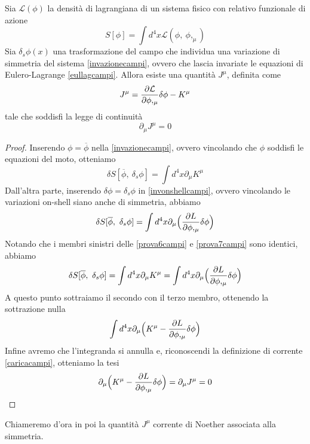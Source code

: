 \begin{theorem}
    Sia $\mathcal L(\phi)$ la densità di lagrangiana di un sistema fisico con relativo funzionale di azione
\begin{equation*}
    S[\phi] = \int d^4 x \mathcal L(\phi,~\phi,_\mu)
\end{equation*}
    Sia $\delta_s \phi(x)$ una trasformazione del campo che individua una variazione di simmetria del sistema \eqref{invazionecampi}, ovvero che lascia invariate le equazioni di Eulero-Lagrange \eqref{eullagcampi}. Allora esiste una quantità $J^\mu$, definita come
\begin{equation}\label{caricacampi}
    J^\mu = \frac{\partial\mathcal L}{\partial\phi,_\mu} \delta \phi - K^\mu 
\end{equation}
    tale che soddisfi la legge di continuità
\begin{equation} \label{thcampi}
    \partial_\mu J^\mu = 0
\end{equation}
\end{theorem}

\begin{proof}
    Inserendo $\phi = \overline \phi$ nella \eqref{invazionecampi}, ovvero vincolando che $\phi$ soddisfi le equazioni del moto, otteniamo 
\begin{equation}\label{prova6campi}
    \delta S[\overline \phi, ~\delta_s \phi] = \int d^4 x \partial_\mu K^\mu
\end{equation}
    Dall'altra parte, inserendo $\delta \phi = \delta_s \phi$ in \eqref{invonshellcampi}, ovvero vincolando le variazioni on-shell siano anche di simmetria, abbiamo
\begin{equation}\label{prova7campi}
    \delta S[\overline \phi,~\delta_s \phi] = \int d^4 x \partial_\mu \Big ( \frac{\partial L}{\partial\phi,_\mu}  \delta \phi \Big)
\end{equation}
    Notando che i membri sinistri delle \eqref{prova6campi} e \eqref{prova7campi} sono identici, abbiamo
\begin{equation}
    \delta S[\overline \phi, ~\delta_s \phi] = \int d^4 x \partial_\mu K^\mu = \int d^4 x \partial_\mu \Big ( \frac{\partial L}{\partial\phi,_\mu}  \delta \phi \Big)
\end{equation}
    A questo punto sottraiamo il secondo con il terzo membro, ottenendo la sottrazione nulla
\begin{equation}
    \int d^4 x \partial_\mu \Big ( K^\mu - \frac{\partial L}{\partial\phi,_\mu}  \delta \phi \Big)
\end{equation}
    Infine avremo che l'integranda si annulla e, riconoscendi la definizione di corrente \eqref{caricacampi}, otteniamo la tesi
\begin{equation}
    \partial_\mu \Big ( K^\mu - \frac{\partial L}{\partial\phi,_\mu}  \delta \phi \Big) = \partial_\mu J^\mu = 0
\end{equation}
\end{proof}
    Chiameremo d'ora in poi la quantità $J^\mu$ corrente di Noether associata alla simmetria. 

